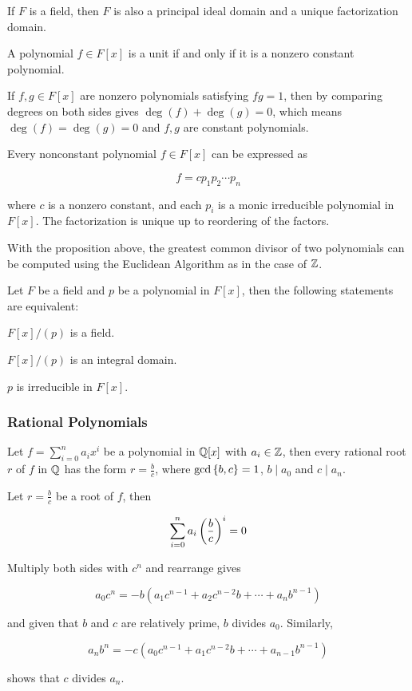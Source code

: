 \documentclass[a4paper,12pt]{article}
\begin{document}
\begin{pst}
  If $F$ is a field, then $F$ is also a principal ideal domain and a unique factorization domain.
\end{pst}\n

\begin{pst}
  A polynomial $f\in F[x]$ is a unit if and only if it is a nonzero constant polynomial.\n

  \prf If $f,g\in F[x]$ are nonzero polynomials satisfying $fg=1$, then by comparing degrees on both sides gives $\deg(f)+\deg(g)=0$, which means $\deg(f)=\deg(g)=0$ and $f,g$ are constant polynomials.
\end{pst}\n

\begin{crl}
  Every nonconstant polynomial $f\in F[x]$ can be expressed as

  $$f=cp_{1}p_{2}\cdots p_{n}$$\s

  where $c$ is a nonzero constant, and each $p_{i}$ is a monic irreducible polynomial in $F[x]$. The factorization is unique up to reordering of the factors.
\end{crl}\n

With the proposition above, the greatest common divisor of two polynomials can be computed using the Euclidean Algorithm as in the case of $\mathbb{Z}$.\n

\begin{thm}
  Let $F$ be a field and $p$ be a polynomial in $F[x]$, then the following statements are equivalent:

  \begin{alist}
    \item $F[x]/(p)$ is a field.
    \item $F[x]/(p)$ is an integral domain.
    \item $p$ is irreducible in $F[x]$.
  \end{alist}
\end{thm}

\subsubsection{Rational Polynomials}
\begin{pst}
  Let $f=\sum_{i=0}^{n}a_{i}x^{i}$ be a polynomial in $\mathbb{Q}[x]$ with $a_{i}\in\mathbb{Z}$, then every rational root $r$ of $f$ in $\mathbb{Q}$ has the form $r=\frac{b}{c}$, where $\gcd\left\{ b,c\right\}=1$, $b\!\mid\!a_{0}$ and $c\!\mid\!a_{n}$.\n

  \prf Let $r=\frac{b}{c}$ be a root of $f$, then

  $$\sum_{i=0}^{n}a_{i}\left( \frac{b}{c}\right)^{i}=0$$\s

  Multiply both sides with $c^{n}$ and rearrange gives

  $$a_{0}c^{n}=-b(a_{1}c^{n-1}+a_{2}c^{n-2}b+\cdots+a_{n}b^{n-1})$$\s

  and given that $b$ and $c$ are relatively prime, $b$ divides $a_{0}$. Similarly,

  $$a_{n}b^{n}=-c(a_{0}c^{n-1}+a_{1}c^{n-2}b+\cdots+a_{n-1}b^{n-1})$$\s

  shows that $c$ divides $a_{n}$.
\end{pst}\n
\end{document}
